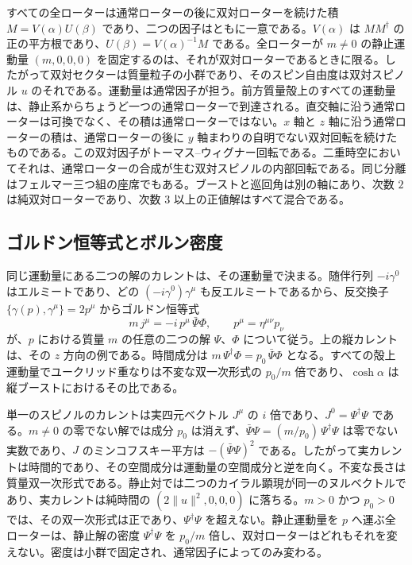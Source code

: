 \documentclass[a4paper]{article}
\begin{document}
すべての全ローターは通常ローターの後に双対ローターを続けた積 $M=V(\alpha)U(\beta)$ であり、二つの因子はともに一意である。$V(\alpha)$ は $MM^\dagger$ の正の平方根であり、$U(\beta)=V(\alpha)^{-1}M$ である。全ローターが $m\neq 0$ の静止運動量 $(m,0,0,0)$ を固定するのは、それが双対ローターであるときに限る。したがって双対セクターは質量粒子の小群であり、そのスピン自由度は双対スピノル $u$ のそれである。運動量は通常因子が担う。前方質量殻上のすべての運動量は、静止系からちょうど一つの通常ローターで到達される。直交軸に沿う通常ローターは可換でなく、その積は通常ローターではない。$x$ 軸と $z$ 軸に沿う通常ローターの積は、通常ローターの後に $y$ 軸まわりの自明でない双対回転を続けたものである。この双対因子がトーマス--ウィグナー回転である。二重時空においてそれは、通常ローターの合成が生む双対スピノルの内部回転である。同じ分離はフェルマー三つ組の座席でもある。ブーストと巡回角は別の軸にあり、次数 \(2\) は純双対ローターであり、次数 \(3\) 以上の正値解はすべて混合である。

\subsection{ゴルドン恒等式とボルン密度}

同じ運動量にある二つの解のカレントは、その運動量で決まる。随伴行列 $-i\gamma^0$ はエルミートであり、どの $(-i\gamma^0)\gamma^\mu$ も反エルミートであるから、反交換子 $\{\gamma(p),\gamma^\mu\}=2p^\mu$ からゴルドン恒等式
\[
m\,j^\mu=-i\,p^\mu\,\bar\Psi\Phi,\qquad p^\mu=\eta^{\mu\nu}p_\nu
\]
が、$p$ における質量 $m$ の任意の二つの解 $\Psi$、$\Phi$ について従う。上の縦カレントは、その $z$ 方向の例である。時間成分は $m\,\Psi^\dagger\Phi=p_0\,\bar\Psi\Phi$ となる。すべての殻上運動量でユークリッド重なりは不変な双一次形式の $p_0/m$ 倍であり、$\cosh\alpha$ は縦ブーストにおけるその比である。

単一のスピノルのカレントは実四元ベクトル $J^\mu$ の $i$ 倍であり、$J^0=\Psi^\dagger\Psi$ である。$m\neq 0$ の零でない解では成分 $p_0$ は消えず、$\bar\Psi\Psi=(m/p_0)\,\Psi^\dagger\Psi$ は零でない実数であり、$J$ のミンコフスキー平方は $-(\bar\Psi\Psi)^2$ である。したがって実カレントは時間的であり、その空間成分は運動量の空間成分と逆を向く。不変な長さは質量双一次形式である。静止対では二つのカイラル顕現が同一のヌルベクトルであり、実カレントは純時間の $(2\lVert u\rVert^2,0,0,0)$ に落ちる。$m>0$ かつ $p_0>0$ では、その双一次形式は正であり、$\Psi^\dagger\Psi$ を超えない。静止運動量を $p$ へ運ぶ全ローターは、静止解の密度 $\Psi^\dagger\Psi$ を $p_0/m$ 倍し、双対ローターはどれもそれを変えない。密度は小群で固定され、通常因子によってのみ変わる。
\end{document}
